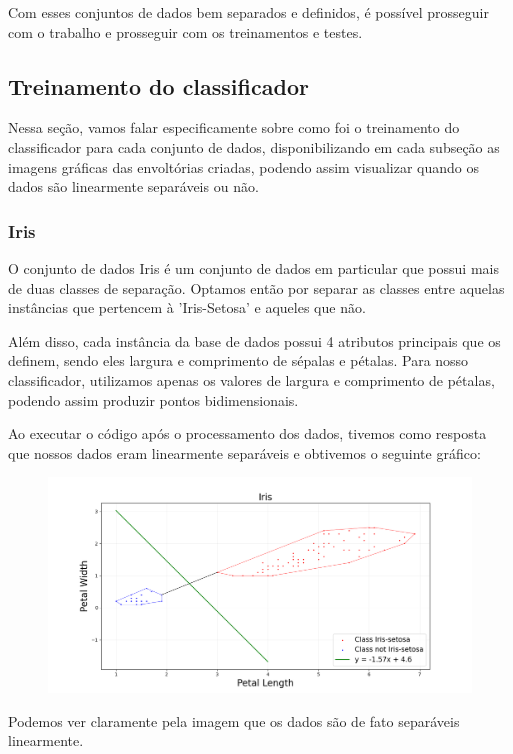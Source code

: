 \documentclass{article}
\begin{document}
Com esses conjuntos de dados bem separados e definidos, é possível prosseguir com o trabalho e prosseguir com os treinamentos e testes.

\subsection{Treinamento do classificador}

Nessa seção, vamos falar especificamente sobre como foi o treinamento do classificador para cada conjunto de dados, disponibilizando em cada subseção as imagens gráficas das envoltórias criadas, podendo assim visualizar quando os dados são linearmente separáveis ou não.

\subsubsection{Iris}

O conjunto de dados Iris é um conjunto de dados em particular que possui mais de duas classes de separação. Optamos então por separar as classes entre aquelas instâncias que pertencem à 'Iris-Setosa' e aqueles que não.

Além disso, cada instância da base de dados possui 4 atributos principais que os definem, sendo eles largura e comprimento de sépalas e pétalas. Para nosso classificador, utilizamos apenas os valores de largura e comprimento de pétalas, podendo assim produzir pontos bidimensionais.

Ao executar o código após o processamento dos dados, tivemos como resposta que nossos dados eram linearmente separáveis e obtivemos o seguinte gráfico:

\begin{figure} [H]
	\includegraphics[width=12cm]{iris.png}
	\centering
\end{figure}

Podemos ver claramente pela imagem que os dados são de fato separáveis linearmente.
\end{document}
